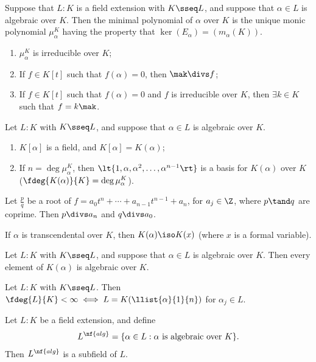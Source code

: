 \documentclass[a4paper]{article}
\begin{document}
\begin{tdefinition}
  Suppose that $L : K$ is a field extension with $K \sseq L$, and suppose that $\alpha\in L$ is algebraic over $K$.
  Then the minimal polynomial of $ \alpha $ over $K$ is the unique monic polynomial $\mu_\alpha^K$ having the property that $ \ker(E_\alpha) = (m_\alpha(K))$.
\end{tdefinition}

\begin{tlemma}
  \begin{enumerate}
    \item $ \mu_\alpha^K $ is irreducible over $ K $;
    \item If $ f\in K[t] $ such that $ f(\alpha) = 0 $, then $ \mak\divs f $;
    \item If $ f\in K[t] $ such that $ f(\alpha) = 0 $ and $ f $ is irreducible over $ K $, then $ \exists k\in K $ such that $ f=k\mak $.
  \end{enumerate}
\end{tlemma}

\begin{ttheorem}
  Let $L : K$ with $K \sseq L$, and suppose that $\alpha\in L$ is algebraic over $K$.
  \begin{enumerate}[label=(\roman*)]
    \item $ K[\alpha] $ is a field, and $ K[\alpha] = K(\alpha) $;
    \item If $ n=\deg \mu_\alpha^K $, then $ \lt\{ 1,\alpha,\alpha^2,\ldots,\alpha^{n-1} \rt\} $ is a basis for $ K(\alpha) $ over $ K $ (\imp $ \fdeg{K(\alpha)}{K}=\deg \mu_\alpha^K $).
  \end{enumerate}
\end{ttheorem}

\begin{ttheorem}
  Let $ \frac{p}{q} $ be a root of $ f= a_0t^n+\cdots + a_{n-1} t^{n-1} + a_n $, for $ a_j\in\Z $, where $ p\tand q $ are coprime.
  Then $ p\divs a_n $ and $ q\divs a_0 $.
\end{ttheorem}

\quad If $ \alpha $ is transcendental over $ K $, then $ K(\alpha)\iso K(x) $ (where $ x $ is a formal variable).

\begin{tcorollary}
  Let $L : K$ with $K \sseq L$, and suppose that $\alpha\in L$ is algebraic over $K$.
  Then every element of $ K(\alpha) $ is algebraic over $ K $.
\end{tcorollary}

\begin{tcorollary}
  Let $ L:K $ with $ K\sseq L $.
  Then $ \fdeg{L}{K} < \infty \iff L=K(\llist{\alpha}{1}{n}) $ for $ \alpha_j\in L $.
\end{tcorollary}

\begin{ttheorem}
  Let $ L:K $ be a field extension, and define \begin{align*}
    L^{\nf{alg}}=\{\alpha\in L : \alpha \text{ is algebraic over } K\}.
  \end{align*}
  Then $ L^{\nf{alg}} $ is a subfield of $ L $.
\end{ttheorem}
\end{document}
